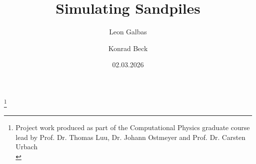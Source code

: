 \title{Simulating Sandpiles}%
\thanks{
    Project work produced as part of the Computational Physics graduate course lead by
    Prof. Dr. Thomas Luu, Dr. Johann Ostmeyer and Prof. Dr. Carsten Urbach \\
}%

\author{Leon Galbas}

\author{Konrad Beck}%



\date{02.03.2026}

